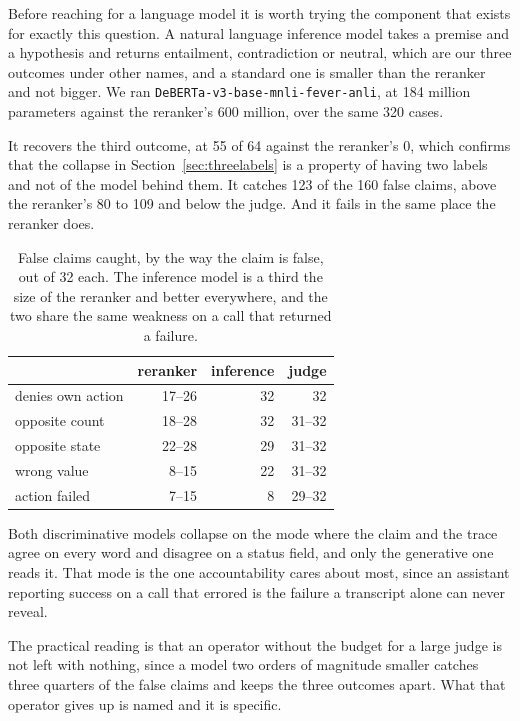 \documentclass[11pt,a4paper]{article}
\begin{document}
Before reaching for a language model it is worth trying the component that exists for
exactly this question. A natural language inference model takes a premise and a
hypothesis and returns entailment, contradiction or neutral, which are our three
outcomes under other names, and a standard one is smaller than the reranker and not
bigger. We ran \texttt{DeBERTa-v3-base-mnli-fever-anli}, at 184 million parameters
against the reranker's 600 million, over the same 320 cases.

It recovers the third outcome, at 55 of 64 against the reranker's 0, which confirms
that the collapse in Section~\ref{sec:threelabels} is a property of having two labels
and not of the model behind them. It catches 123 of the 160 false claims, above the
reranker's 80 to 109 and below the judge. And it fails in the same place the reranker
does.

\begin{table}[htbp]
\centering
\small
\caption{False claims caught, by the way the claim is false, out of 32 each. The
inference model is a third the size of the reranker and better everywhere, and the two
share the same weakness on a call that returned a failure.}
\label{tab:modes}
\begin{tabular}{lrrr}
\toprule
& \textbf{reranker} & \textbf{inference} & \textbf{judge} \\
\midrule
denies own action  & 17--26 & 32 & 32 \\
opposite count     & 18--28 & 32 & 31--32 \\
opposite state     & 22--28 & 29 & 31--32 \\
wrong value        &  8--15 & 22 & 31--32 \\
action failed      &  7--15 &  8 & 29--32 \\
\bottomrule
\end{tabular}
\end{table}

Both discriminative models collapse on the mode where the claim and the trace agree on
every word and disagree on a status field, and only the generative one reads it. That
mode is the one accountability cares about most, since an assistant reporting success
on a call that errored is the failure a transcript alone can never reveal.

The practical reading is that an operator without the budget for a large judge is not
left with nothing, since a model two orders of magnitude smaller catches three quarters
of the false claims and keeps the three outcomes apart. What that operator gives up is
named and it is specific.
\end{document}
